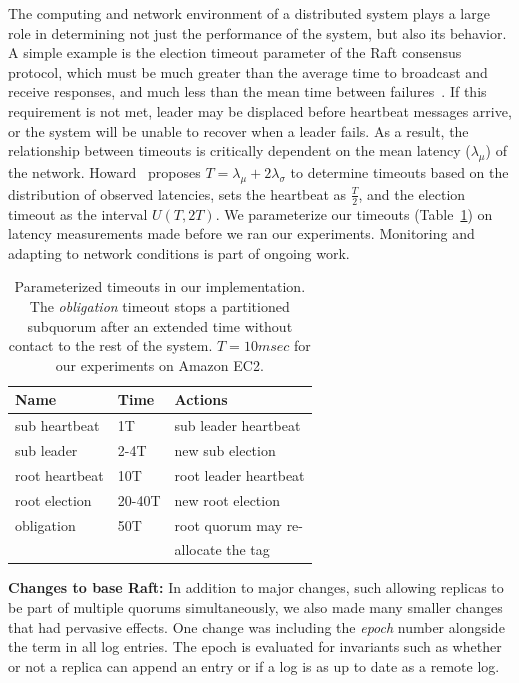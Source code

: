 The computing and network environment of a distributed system
plays a large role in determining not just the performance of the system, but
also its behavior.
A simple example is the election timeout parameter of the Raft consensus
protocol, which must be much greater than the average time to
broadcast and receive responses, and much less than the mean time
between failures~\cite{raft,etcd_raft,oliveira_evaluating_2016}.
If this requirement is not met,
leader may be displaced before heartbeat messages arrive, or the system will be
unable to recover when a leader fails.
As a result, the relationship between timeouts is critically dependent on the mean
latency ($\lambda_{\mu}$) of the network.
Howard~\cite{raft_refloated} proposes  $T = \lambda_{\mu} +
2\lambda_{\sigma}$ to determine timeouts based on the distribution of observed
latencies, sets the heartbeat as $\frac {T} {2}$, and the election timeout as
the interval $U(T,2T)$.
We parameterize our timeouts (Table~\ref{tab:ticks}) on
latency measurements made before we ran our experiments.
Monitoring and adapting to network conditions is part of ongoing work.


\renewcommand{\baselinestretch}{1}
\small\normalsize
 \begin{table}[ht]
\caption[Parameterized Timeouts of Raft Implementation]{Parameterized timeouts in our implementation. The \emph{obligation} timeout
  stops a partitioned subquorum after an extended time without contact to the
  rest of the system. $T=10 msec$ for our experiments on Amazon EC2.}
\begin{center}
\begin{tabular}{l|l|l}
\hline
Name & Time & Actions \\
\hline \hline
sub heartbeat& 1T & sub leader heartbeat\\
sub leader & 2-4T & new sub election\\ \hline
root heartbeat & 10T & root leader heartbeat \\
root election & 20-40T & new root election \\ \hline
obligation & 50T & root quorum may re- \\
 &  & allocate the tag \\
\hline
\end{tabular}
\end{center}
\label{tab:ticks}
\end{table}
 \renewcommand{\baselinestretch}{2}
\small\normalsize

\textbf{Changes to base Raft:} In addition to major changes, such allowing
replicas to be part of multiple quorums simultaneously, we also made many
smaller changes that had pervasive effects.
One change was including the \textit{epoch} number alongside the term in all
log entries.
The epoch is evaluated for invariants such as whether or not a replica can
append an entry or if a log is as up to date as a remote log.

